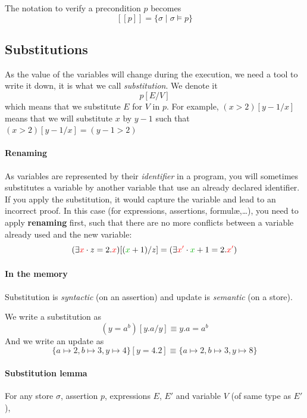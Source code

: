 \documentclass[12pt, a4paper]{book}
\begin{document}
The notation to verify a precondition $p$ becomes
$$
[[p]] = \{\sigma \mid \sigma \vDash p\}
$$

\subsection{Substitutions}
\label{sub:Substitutions}

As the value of the variables will change during the execution, we need a tool
to write it down, it is what we call \textit{substitution}. We denote it
$$
p[E/V]
$$
which means that we substitute $E$ for $V$ in $p$. For example,
$(x>2)[y-1/x]$ means that we will substitute $x$ by $y-1$ such that
$(x>2)[y-1/x]=(y-1>2)$

\paragraph{Renaming} As variables are represented by their \textit{identifier}
in a program, you will sometimes substitutes a variable by another variable that
use an already declared identifier. If you apply the substitution, it would
capture the variable and lead to an incorrect proof. In this case (for
expressions, assertions, formul\ae{},\ldots), you need to
apply \textbf{renaming} first, such that there are no more conflicts between
a variable already used and the new variable:
$$
(\exists \textcolor{red}{x} \cdot z = 2.\textcolor{red}{x})[(\textcolor{green!70!black}{x}+1)/z] = (\exists \textcolor{red}{x'} \cdot \textcolor{green!70!black}{x}+1 = 2.\textcolor{red}{x'})
$$

\paragraph{In the memory} Substitution is \textit{syntactic} (on an assertion)
and update is \textit{semantic} (on a store).

We write a substitution as
$$
(y=a^{b})[y.a/y] \equiv y . a = a^{b}
$$
And we write an update as
$$
\{a \mapsto 2, b \mapsto 3, y\mapsto 4\}[y=4.2] \equiv \{a \mapsto 2, b \mapsto 3, y\mapsto 8\}
$$

\paragraph{Substitution lemma}

For any store $\sigma$, assertion $p$, expressions $E$, $E'$ and variable $V$
(of same type as $E'$),
\end{document}
